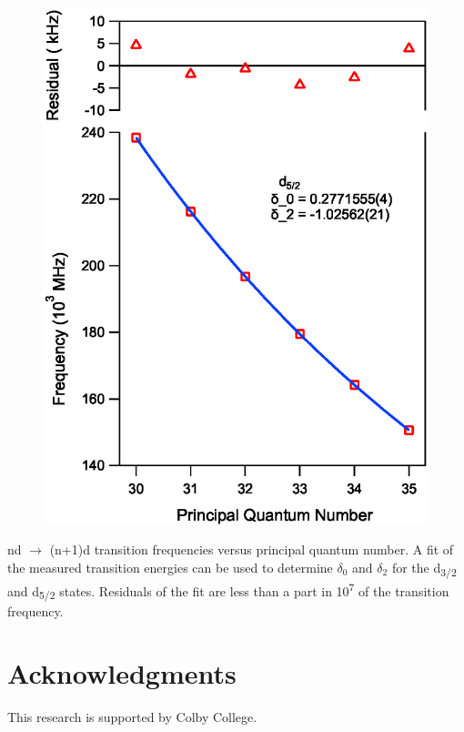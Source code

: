 \documentclass[landscape]{sciposter}
\begin{document}
\begin{multicols}{4}
\begin{figure}
\begin{center}
		\includegraphics[scale = 0.97]{d52_qd.eps}
	\end{center}
\end{figure}

nd $\rightarrow$ (n+1)d transition frequencies versus principal quantum number. A fit of the measured transition energies can be used to determine $\delta_0$ and $\delta_2$ for the d\textsubscript{3/2} and d\textsubscript{5/2} states. Residuals of the fit are less than a part in 10\textsuperscript{7} of the transition frequency.


\section*{\large Acknowledgments}
This research is supported by Colby College.

\end{multicols}
\end{document}
